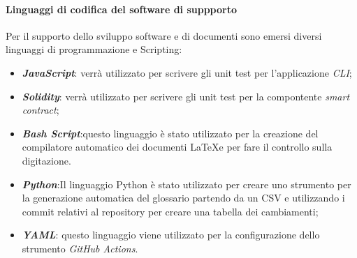 \paragraph{Linguaggi di codifica del software di suppporto}
Per il supporto dello sviluppo software e di documenti sono emersi diversi linguaggi
di programmazione e Scripting:
 \begin{itemize}
   \item \textbf{\textit{JavaScript\glos}}: verrà utilizzato per scrivere gli unit test per l'applicazione \textit{CLI}\glos;
   \item \textbf{\textit{Solidity\glos}}: verrà utilizzato per scrivere gli unit test per la compontente \textit{smart contract}\glos;
   \item \textbf{\textit{Bash Script\glos}}:questo linguaggio è stato utilizzato per la creazione del compilatore automatico
   dei documenti \LaTeX e per fare il controllo sulla digitazione.
   \item \textbf{\textit{Python\glos}}:Il linguaggio Python è stato utilizzato per creare uno strumento per la generazione
   automatica del glossario partendo da un CSV e utilizzando i commit relativi
   al repository per creare una tabella dei cambiamenti;
   \item \textbf{\textit{YAML\glos}}: questo linguaggio viene utilizzato per la configurazione dello strumento \textit{GitHub Actions\glos}.
 \end{itemize}


